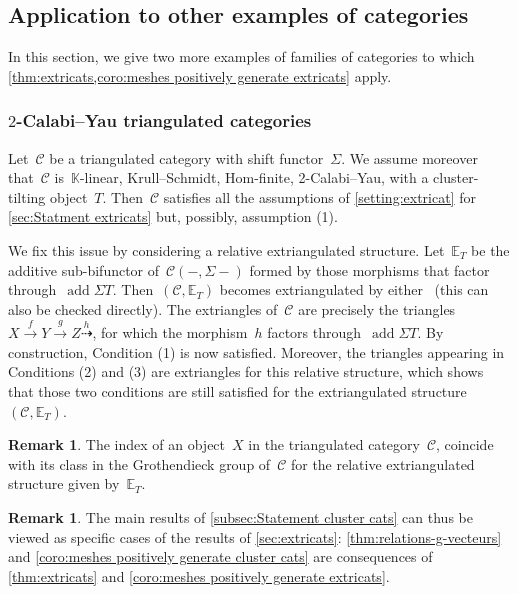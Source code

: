 \documentclass{amsart}
\theoremstyle{definition}
\newtheorem{remark}[theorem]{Remark}
\newcommand{\field}{\mathbb{K}}
\newcommand{\cat}{\mathcal{C}}
\newcommand{\susp}{\Sigma}
\newcommand{\add}{\operatorname{add}}
\begin{document}

\subsection{Application to other examples of categories}

In this section, we give two more examples of families of categories to which \cref{thm:extricats,coro:meshes positively generate extricats} apply.


\subsubsection{$2$-Calabi--Yau triangulated categories}
\label{sec:2CYTriangulated}

Let~$\cat$ be a triangulated category with shift functor~$\susp$.
We assume moreover that~$\cat$ is~$\field$-linear, Krull--Schmidt, Hom-finite, 2-Calabi--Yau, with a cluster-tilting object~$T$.
Then~$\cat$ satisfies all the assumptions of \cref{setting:extricat} for \cref{sec:Statment extricats} but, possibly, assumption (1).

We fix this issue by considering a relative extriangulated structure.
Let~$\mathbb{E}_T$ be the additive sub-bifunctor of~$\cat(-,\susp -)$ formed by those morphisms that factor through~$\add\susp T$.
Then~$(\cat,\mathbb{E}_T)$ becomes extriangulated by either~\cite[Prop.~3.16 or Prop.3.19]{HerschendLiuNakaokaI} (this can also be checked directly).
The extriangles of~$\cat$ are precisely the triangles~$X\overset{f}{\rightarrow}Y\overset{g}{\rightarrow} Z \overset{h}{\dashrightarrow}$, for which the morphism~$h$ factors through~$\add\susp T$.
By construction, Condition (1) is now satisfied.
Moreover, the triangles appearing in Conditions (2) and (3) are extriangles for this relative structure, which shows that those two conditions are still satisfied for the extriangulated structure~$(\cat,\mathbb{E}_T)$.

\begin{remark}
The index of an object~$X$ in the triangulated category~$\cat$, coincide with its class in the Grothendieck group of~$\cat$ for the relative extriangulated structure given by~$\mathbb{E}_T$.
\end{remark}

\begin{remark}
The main results of \cref{subsec:Statement cluster cats} can thus be viewed as specific cases of the results of \cref{sec:extricats}: \cref{thm:relations-g-vecteurs} and \cref{coro:meshes positively generate cluster cats} are consequences of \cref{thm:extricats} and \cref{coro:meshes positively generate extricats}.
\end{remark}
\end{document}
